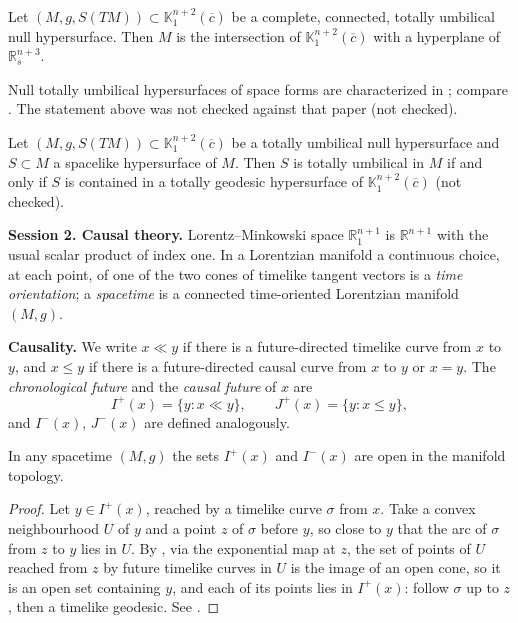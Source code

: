 \begin{proposition}
\label{proposition-solis-umbilic-hyperplane}
Let $(M,g,S(TM))\subset
\mathbb{K}^{n+2}_1(\overline{c})$ be a
complete, connected, totally umbilical
null hypersurface. Then $M$ is the
intersection of
$\mathbb{K}^{n+2}_1(\overline{c})$ with a
hyperplane of $\mathbb{R}^{n+3}_s$.
\end{proposition}

\noindent
Null totally umbilical hypersurfaces of
space forms are characterized in
\cite{navarro2016null}; compare
\cite[Example 5.4]{navarro2020screen}.
The statement above was not checked
against that paper (not checked).

\begin{proposition}
\label{proposition-solis-umbilic-section}
Let $(M,g,S(TM))\subset
\mathbb{K}^{n+2}_1(\overline{c})$ be a
totally umbilical null hypersurface and
$S\subset M$ a spacelike hypersurface of
$M$. Then $S$ is totally umbilical in $M$
if and only if $S$ is contained in a
totally geodesic hypersurface of
$\mathbb{K}^{n+2}_1(\overline{c})$
(not checked).
\end{proposition}

\medskip\noindent
{\bf Session 2. Causal theory.}
Lorentz--Minkowski space
$\mathbb{R}^{n+1}_1$ is $\mathbb{R}^{n+1}$
with the usual scalar product of index
one. In a Lorentzian manifold a continuous
choice, at each point, of one of the two
cones of timelike tangent vectors is a
\emph{time orientation}; a
\emph{spacetime} is a connected
time-oriented Lorentzian manifold
$(M,g)$.

\medskip\noindent
{\bf Causality.} We write $x\ll y$ if
there is a future-directed timelike curve
from $x$ to $y$, and $x\leq y$ if there is
a future-directed causal curve from $x$ to
$y$ or $x=y$. The \emph{chronological
future} and the \emph{causal future} of
$x$ are
$$
I^+(x)=\{y:x\ll y\},\qquad
J^+(x)=\{y:x\leq y\},
$$
and $I^-(x)$, $J^-(x)$ are defined
analogously.

\begin{proposition}
\label{proposition-solis-i-open}
In any spacetime $(M,g)$ the sets
$I^+(x)$ and $I^-(x)$ are open in the
manifold topology.
\end{proposition}

\begin{proof}
Let $y\in I^+(x)$, reached by a timelike
curve $\sigma$ from $x$. Take a convex
neighbourhood $U$ of $y$ and a point $z$
of $\sigma$ before $y$, so close to $y$
that the arc of $\sigma$ from $z$ to $y$
lies in $U$. By \cite[Lemma 14.2]{oneill},
via the exponential map at $z$, the set of
points of $U$ reached from $z$ by future
timelike curves in $U$ is the image of an
open cone, so it is an open set containing
$y$, and
each of its points lies in $I^+(x)$:
follow $\sigma$ up to $z$, then a timelike
geodesic. See \cite[Lemma 14.3]{oneill}.
\end{proof}

